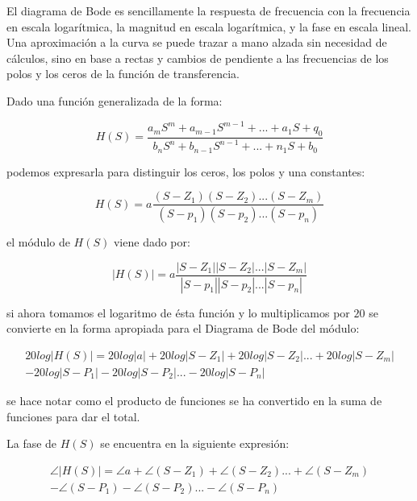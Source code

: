 El diagrama de Bode es sencillamente la respuesta de frecuencia con la frecuencia en escala logarítmica, la magnitud en escala logarítmica, y la fase en escala lineal. Una aproximación a la curva se puede trazar a mano alzada sin necesidad de cálculos, sino en base a rectas y cambios de pendiente a las frecuencias de los polos y los ceros de la función de transferencia.

Dado una función generalizada de la forma:

\begin{equation}\label{eqn:rse_8}
	H(S) = \frac{a_mS^m + a_{m-1}S^{m-1} + ... + a_1S + q_0}{b_nS^n + b_{n-1}S^{n-1} + ... + n_1S + b_0}
\end{equation}

podemos expresarla para distinguir los ceros, los polos y una constantes:

\begin{equation}\label{eqn:rse_9}
	H(S) = a \frac{(S-Z_1)(S-Z_2) ... (S-Z_m)}{(S-p_1)(S-p_2) ... (S-p_n)}
\end{equation}

el módulo de $H(S)$ viene dado por:

\begin{equation}\label{eqn:rse_10}
	|H(S)| = a \frac{|S-Z_1||S-Z_2| ... |S-Z_m|}{|S-p_1||S-p_2| ... |S-p_n|}
\end{equation}

si ahora tomamos el logaritmo de ésta función y lo multiplicamos por $20$ se convierte en la forma apropiada para el Diagrama de Bode del módulo:

\begin{equation}\begin{split}\label{eqn:rse_11}
		20log|H(S)| = 20log|a| + 20log|S-Z_1| + 20log|S-Z_2| ... + 20log|S-Z_m| \\
		- 20log|S-P_1| - 20log|S-P_2| ... - 20log|S-P_n|
\end{split}\end{equation}

se hace notar como el producto de funciones se ha convertido en la suma de funciones para dar el total.

La fase de $H(S)$ se encuentra en la siguiente expresión:

\begin{equation}\begin{split}\label{eqn:rse_12}
		\angle|H(S)| = \angle a + \angle(S-Z_1) + \angle(S-Z_2) ... + \angle(S-Z_m) \\
		- \angle(S-P_1) - \angle(S-P_2) ... - \angle(S-P_n)
\end{split}\end{equation}


